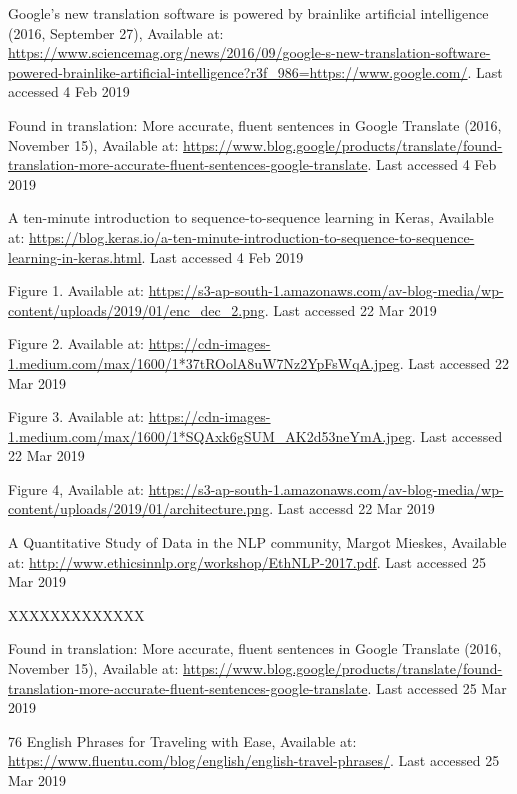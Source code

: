 \documentclass[runningheads]{llncs}
\begin{document}
\begin{thebibliography}{8}
	
	
	Google’s new translation software is powered by brainlike artificial intelligence (2016, September 27), Available at:
	\url{https://www.sciencemag.org/news/2016/09/google-s-new-translation-software-powered-brainlike-artificial-intelligence?r3f\_986=https://www.google.com/}.  Last accessed 4 Feb 2019
	
	
	Found in translation: More accurate, fluent sentences in Google Translate (2016, November 15), Available at: \url{https://www.blog.google/products/translate/found-translation-more-accurate-fluent-sentences-google-translate}.  Last accessed 4 Feb 2019

	A ten-minute introduction to sequence-to-sequence learning in Keras, Available at: \url{https://blog.keras.io/a-ten-minute-introduction-to-sequence-to-sequence-learning-in-keras.html}.  Last accessed 4 Feb 2019
	
	Figure 1. Available at: \url{https://s3-ap-south-1.amazonaws.com/av-blog-media/wp-content/uploads/2019/01/enc_dec_2.png}.  Last accessed 22 Mar 2019
	
	Figure 2. Available at: \url{https://cdn-images-1.medium.com/max/1600/1*37tROolA8uW7Nz2YpFsWqA.jpeg}.  Last accessed 22 Mar 2019

	Figure 3. Available at: \url{https://cdn-images-1.medium.com/max/1600/1*SQAxk6gSUM_AK2d53neYmA.jpeg}. Last accessed 22 Mar 2019

	Figure 4, Available at: \url{https://s3-ap-south-1.amazonaws.com/av-blog-media/wp-content/uploads/2019/01/architecture.png}. Last accessd 22 Mar 2019
	
	A Quantitative Study of Data in the NLP community, Margot Mieskes, Available at: \url{http://www.ethicsinnlp.org/workshop/EthNLP-2017.pdf}.  Last accessed 25 Mar 2019

	XXXXXXXXXXXXX

	Found in translation: More accurate, fluent sentences in Google Translate (2016, November 15), Available at: \url{https://www.blog.google/products/translate/found-translation-more-accurate-fluent-sentences-google-translate}.  Last accessed 25 Mar 2019

	76 English Phrases for Traveling with Ease, Available at: \url{https://www.fluentu.com/blog/english/english-travel-phrases/}.  Last accessed 25 Mar 2019


\end{thebibliography}
\end{document}
